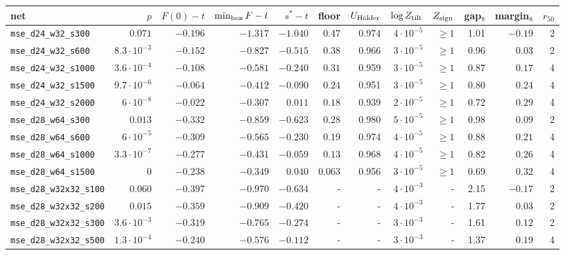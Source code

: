 \begin{tabular}{lrrrrrrrrrrr}
\toprule
net & $p$ & $F(0)-t$ & $\min_{\rm box}F-t$ & $s^*-t$ & floor & $U_{\rm H\ddot older}$ & $\log Z_{\rm tilt}$ & $Z_{\rm sign}$ & gap$_8$ & margin$_8$ & $r_{50}$\\
\midrule
\texttt{mse\_d24\_w32\_s300} & $0.071$ & $-0.196$ & $-1.317$ & $-1.040$ & $0.47$ & 0.974 & $4\cdot10^{-5}$ & $\geq1$ & 1.01 & $-0.19$ & 2\\
\texttt{mse\_d24\_w32\_s600} & $8.3\cdot10^{-3}$ & $-0.152$ & $-0.827$ & $-0.515$ & $0.38$ & 0.966 & $3\cdot10^{-5}$ & $\geq1$ & 0.96 & $0.03$ & 2\\
\texttt{mse\_d24\_w32\_s1000} & $3.6\cdot10^{-4}$ & $-0.108$ & $-0.581$ & $-0.240$ & $0.31$ & 0.959 & $3\cdot10^{-5}$ & $\geq1$ & 0.87 & $0.17$ & 4\\
\texttt{mse\_d24\_w32\_s1500} & $9.7\cdot10^{-6}$ & $-0.064$ & $-0.412$ & $-0.090$ & $0.24$ & 0.951 & $3\cdot10^{-5}$ & $\geq1$ & 0.80 & $0.24$ & 4\\
\texttt{mse\_d24\_w32\_s2000} & $6\cdot10^{-8}$ & $-0.022$ & $-0.307$ & $0.011$ & $0.18$ & 0.939 & $2\cdot10^{-5}$ & $\geq1$ & 0.72 & $0.29$ & 4\\
\texttt{mse\_d28\_w64\_s300} & $0.013$ & $-0.332$ & $-0.859$ & $-0.623$ & $0.28$ & 0.980 & $5\cdot10^{-5}$ & $\geq1$ & 0.98 & $0.09$ & 2\\
\texttt{mse\_d28\_w64\_s600} & $6\cdot10^{-5}$ & $-0.309$ & $-0.565$ & $-0.230$ & $0.19$ & 0.974 & $4\cdot10^{-5}$ & $\geq1$ & 0.88 & $0.21$ & 4\\
\texttt{mse\_d28\_w64\_s1000} & $3.3\cdot10^{-7}$ & $-0.277$ & $-0.431$ & $-0.059$ & $0.13$ & 0.968 & $4\cdot10^{-5}$ & $\geq1$ & 0.82 & $0.26$ & 4\\
\texttt{mse\_d28\_w64\_s1500} & $0$ & $-0.238$ & $-0.349$ & $0.040$ & $0.063$ & 0.956 & $3\cdot10^{-5}$ & $\geq1$ & 0.69 & $0.32$ & 4\\
\texttt{mse\_d28\_w32x32\_s100} & $0.060$ & $-0.397$ & $-0.970$ & $-0.634$ & - & - & $4\cdot10^{-3}$ & - & 2.15 & $-0.17$ & 2\\
\texttt{mse\_d28\_w32x32\_s200} & $0.015$ & $-0.359$ & $-0.909$ & $-0.420$ & - & - & $4\cdot10^{-3}$ & - & 1.77 & $0.03$ & 2\\
\texttt{mse\_d28\_w32x32\_s300} & $3.6\cdot10^{-3}$ & $-0.319$ & $-0.765$ & $-0.274$ & - & - & $3\cdot10^{-3}$ & - & 1.61 & $0.12$ & 2\\
\texttt{mse\_d28\_w32x32\_s500} & $1.3\cdot10^{-4}$ & $-0.240$ & $-0.576$ & $-0.112$ & - & - & $3\cdot10^{-3}$ & - & 1.37 & $0.19$ & 4\\

\end{tabular}
